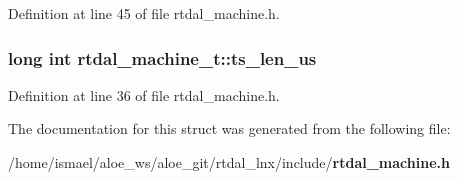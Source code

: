 Definition at line 45 of file rtdal\-\_\-machine.\-h.

\subsubsection[{ts\-\_\-len\-\_\-us}]{\setlength{\rightskip}{0pt plus 5cm}long int rtdal\-\_\-machine\-\_\-t\-::ts\-\_\-len\-\_\-us}\label{structrtdal__machine__t_a3936ac0026875f5c55dee7beb42f851c}


Definition at line 36 of file rtdal\-\_\-machine.\-h.



The documentation for this struct was generated from the following file\-:\begin{DoxyCompactItemize}
\item 
/home/ismael/aloe\-\_\-ws/aloe\-\_\-git/rtdal\-\_\-lnx/include/{\bf rtdal\-\_\-machine.\-h}\end{DoxyCompactItemize}
